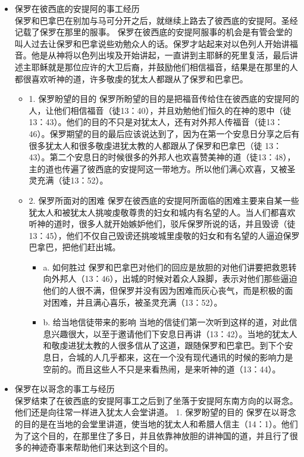 \begin{itemize} 
\itemsep-.5em 
\item 保罗在彼西底的安提阿的事工经历\\
保罗和巴拿巴在别加与马可分开之后，就继续上路去了彼西底的安提阿。圣经记载了保罗在那里的服事。
保罗在彼西底的安提阿服事的机会是有管会堂的叫人过去让保罗和巴拿说些劝勉众人的话。保罗才站起来对以色列人开始讲福音。他是从神将以色列出埃及开始讲起，一直讲到主耶稣的死里复活，最后讲述主耶稣就是那位应许的大卫后裔，并鼓励他们相信福音，结果是在那里的人都很喜欢听神的道，许多敬虔的犹太人都跟从了保罗和巴拿巴。
\begin{itemize} 
\itemsep-.5em 
\item 1.	保罗盼望的目的
保罗所盼望的目的是把福音传给住在彼西底的安提阿的人，让他们相信福音（徒13：40），并且劝勉他们恒久的在神的恩中（徒13：43）。他们的目的不只是对犹太人，还有对外邦人传福音（徒13：46）。保罗期望的目的最后应该说达到了，因为在第一个安息日分享之后有很多犹太人和很多敬虔进犹太教的人都跟从了保罗和巴拿巴（徒 13：43）。第二个安息日的时候很多的外邦人也欢喜赞美神的道（徒13：48），主的道也传遍了彼西底的安提阿这一带地方。所以他们满心欢喜，又被圣灵充满（徒13：52）。
\item 2.	保罗所面对的困难
保罗在彼西底的安提阿所面临的困难主要来自某一些犹太人和被犹太人挑唆虔敬尊贵的妇女和城内有名望的人。当人们都喜欢听神的道时，很多人就开始嫉妒他们，驳斥保罗所说的话，并且毁谤（徒13：45），他们不仅自己毁谤还挑唆城里虔敬的妇女和有名望的人逼迫保罗巴拿巴，把他们赶出城。
\begin{itemize} 
\itemsep-.5em 
\item a.	如何胜过
保罗和巴拿巴对他们的回应是放胆的对他们讲要把救恩转向外邦人（13：46），出城的时候对着众人跺脚，表示对他们那些逼迫他们的人很不满，但保罗并没有因为困难而灰心丧气，而是积极的面对困难，并且满心喜乐，被圣灵充满（13：52）。
\item b.	给当地信徒带来的影响
当地的信徒们第一次听到这样的道，对此信息兴趣很大，以至于邀请他们下安息日再讲（13：42）。当地的犹太人和敬虔进犹太教的人很多信从了这道，跟随保罗和巴拿巴。到下个安息日，合城的人几乎都来，这在一个没有现代通讯的时候的影响力是空前的。而且这些人不只是来看热闹，是来听神的道（13：44）。
\end{itemize}
\end{itemize}
\item 保罗在以哥念的事工与经历\\
保罗结束了在彼西底的安提阿事工之后到了坐落于安提阿东南方向的以哥念。他们还是向往常一样进入犹太人会堂讲道。
1.	保罗盼望的目的
保罗在以哥念的目的是在当地的会堂里讲道，使当地的犹太人和希腊人信主（14：1）。他们为了这个目的，在那里住了多日，并且依靠神放胆的讲神国的道，并且行了很多的神迹奇事来帮助他们来达到这个目的。

\end{itemize}
